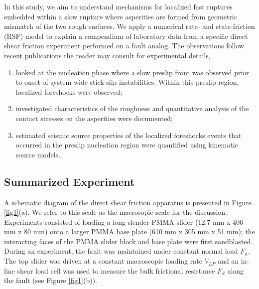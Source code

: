 \documentclass[preprint,1p, 10pt,authoryear]{elsarticle}
\begin{document}
In this study, we aim to understand mechanisms for localized fast ruptures embedded within a slow rupture where asperities are formed from geometric mismatch of the two rough surfaces. We apply a numerical rate- and state-friction (RSF) model \citep{Dieterich1979,Ampuero2008, Rubin2005} to explain a compendium of laboratory data from a specific direct shear friction experiment performed on a fault analog. The observations follow recent publications the reader may consult for experimental details,

\begin{enumerate}
    \item \citet{Selvadurai2015} looked at the nucleation phase where a slow preslip front was observed prior to onset of system wide stick-slip instabilities. Within this preslip region, localized foreshocks were observed;
    \item \citet{Selvadurai2017} investigated characteristics of the roughness and quantitative analysis of the contact stresses on the asperities were documented;
    \item \citet{Selvadurai2019} estimated seismic source properties of the localized foreshocks events that occurred in the preslip nucleation region were quantified using kinematic source models.
\end{enumerate}


\subsection{Summarized Experiment}
\label{GeneralExp}
A schematic diagram of the direct shear friction apparatus is presented in Figure \ref{fig1}(a). We refer to this scale as the macrosopic scale for the discussion. Experiments consisted of loading a long slender PMMA slider (12.7 mm x 406 mm x 80 mm) onto a larger PMMA base plate (610 mm x 305 mm x 51 mm); the interacting faces of the PMMA slider block and base plate were first sandblasted. During an experiment, the fault was maintained under constant normal load $F_{n}$.  The top slider was driven at a constant macroscopic loading rate $V_{LP}$ and an in-line shear load cell was used to measure the bulk frictional resistance $F_{S}$ along the fault (see Figure \ref{fig1}(b)).   
  
\end{document}
